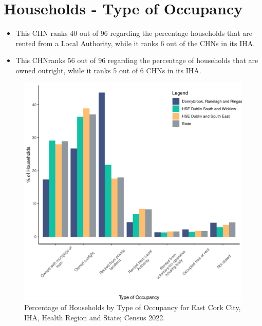 \documentclass{article}
\begin{document}
\section{Households - Type of Occupancy}\label{sect:Households}
\begin{itemize}
\item This CHN ranks  40 out of 96 regarding the percentage households that are rented from a Local Authority, while it ranks  6 out of the CHNs in its IHA. 
\item This CHNranks  56 out of 96 regarding the percentage of households that are owned outright, while it ranks   5 out of 6 CHNs in its IHA.
\end{itemize}
\begin{figure}[H]
	\centering
	\includegraphics[width = 140mm]{../figures/HouseholdsED.pdf}
	\caption{Percentage of Households by Type of Occupancy for East Cork City, IHA, Health Region and State; Census 2022.}
	\label{fig:vbnv}
	\end{figure}
\end{document}

